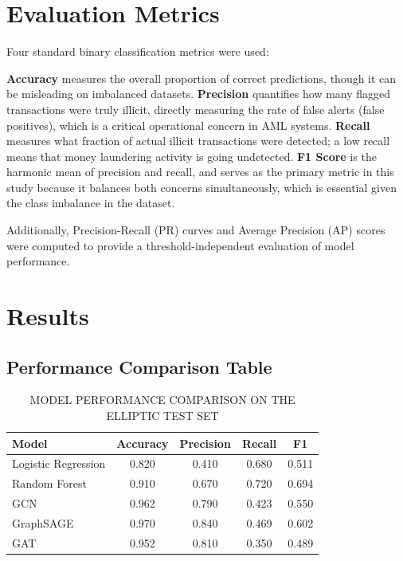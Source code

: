 \documentclass[conference]{IEEEtran}
\begin{document}
\section{Evaluation Metrics}

Four standard binary classification metrics were used:

\textbf{Accuracy} measures the overall proportion of correct predictions, though it can be misleading on imbalanced datasets. \textbf{Precision} quantifies how many flagged transactions were truly illicit, directly measuring the rate of false alerts (false positives), which is a critical operational concern in AML systems. \textbf{Recall} measures what fraction of actual illicit transactions were detected; a low recall means that money laundering activity is going undetected. \textbf{F1 Score} is the harmonic mean of precision and recall, and serves as the primary metric in this study because it balances both concerns simultaneously, which is essential given the class imbalance in the dataset.

Additionally, Precision-Recall (PR) curves and Average Precision (AP) scores were computed to provide a threshold-independent evaluation of model performance.

\section{Results}

\subsection{Performance Comparison Table}

\begin{table}[htbp]
\caption{MODEL PERFORMANCE COMPARISON ON THE ELLIPTIC TEST SET}
\centering
\begin{tabular}{|l|c|c|c|c|}
\hline
\textbf{Model} & \textbf{Accuracy} & \textbf{Precision} & \textbf{Recall} & \textbf{F1} \\
\hline
Logistic Regression & 0.820 & 0.410 & 0.680 & 0.511 \\
Random Forest & 0.910 & 0.670 & 0.720 & 0.694 \\
GCN & 0.962 & 0.790 & 0.423 & 0.550 \\
GraphSAGE & 0.970 & 0.840 & 0.469 & 0.602 \\
GAT & 0.952 & 0.810 & 0.350 & 0.489 \\
\hline
\end{tabular}
\label{tab:results}
\end{table}
\end{document}
